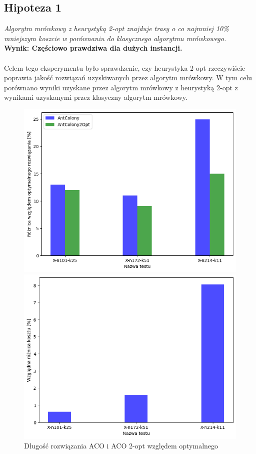 \documentclass{article}
\begin{document}
\subsection{Hipoteza 1}
\textit{Algorytm mrówkowy z heurystyką 2-opt znajduje trasy o co najmniej 10\% mniejszym koszcie w porównaniu do klasycznego algorytmu mrówkowego.}
\\
\textbf{Wynik: Częściowo prawdziwa dla dużych instancji.} 
\\ \\
Celem tego eksperymentu było sprawdzenie, czy heurystyka 2-opt rzeczywiście poprawia jakość rozwiązań uzyskiwanych przez algorytm mrówkowy. W tym celu porównano wyniki uzyskane przez algorytm mrówkowy z heurystyką 2-opt z wynikami uzyskanymi przez klasyczny algorytm mrówkowy.


\begin{figure}[H]
    \centering
    \begin{minipage}{0.48\textwidth}
        \centering
        \includegraphics[width=\linewidth]{img/2opt_wzgledem_optymalnego.png}
        \caption{Długość rozwiązania ACO i ACO 2-opt względem optymalnego}
        \label{fig:2opt_wzgledem_optymalnego}
    \end{minipage}
    \hfill
    \begin{minipage}{0.48\textwidth}
        \centering
        \includegraphics[width=\linewidth]{img/2opt_wzgledem_zwyklego.png}

\end{minipage}
\end{figure}
\end{document}
